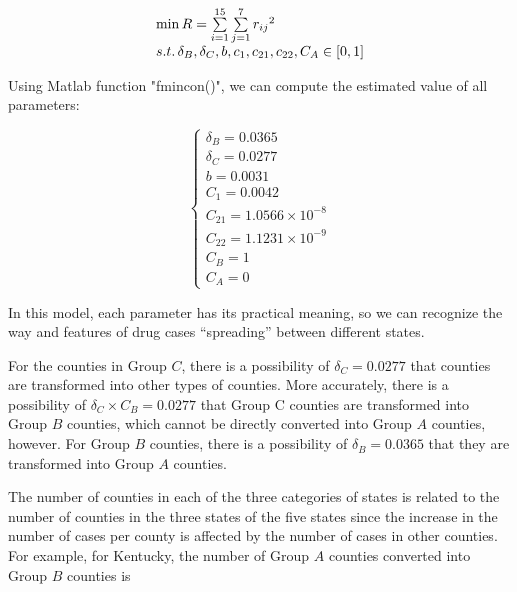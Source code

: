 \documentclass{mcmthesis}
\newcommand{\upcite}[1]{\textsuperscript{\textsuperscript{\cite{#1}}}}
\begin{document}
 \begin{equation}\begin{array}{l}
\min R = \sum\limits_{i = 1}^{15} {\sum\limits_{j = 1}^7 {{r_{ij}}^2} } \\
s.t.\,{\rm{  }}{\delta _B},{\delta _C},b,{c_1},{c_{21}},{c_{22}},{C_A} \in [0,1]
\end{array} \end{equation}
Using Matlab function "fmincon()"\upcite{higham2016matlab}, we can compute the estimated value of all parameters:
 
 \begin{equation}\left\{ \begin{array}{l}
{\delta _B} = 0.0365\\
{\delta _C} = 0.0277\\
b = 0.0031\\
{C_1} = 0.0042\\
{C_{21}} = 1.0566 \times {10^{ - 8}}\\
{C_{22}} = 1.1231 \times {10^{ - 9}}\\
{C_B} = 1\\
{C_A} = 0
\end{array} \right. \end{equation}

In this model, each parameter has its practical meaning, so we can recognize the way and features of drug cases “spreading” between different states.

For the counties in Group $C$, there is a possibility of ${\delta _C} = 0.0277$ that counties are transformed into other types of counties. More accurately, there is a possibility of ${\delta _C} \times {C_B} = 0.0277$ that Group C counties are transformed into Group $B$ counties, which cannot be directly converted into Group $A$ counties, however. For Group $B$ counties, there is a possibility of ${\delta _B} = 0.0365$ that they are transformed into Group $A$ counties.

The number of counties in each of the three categories of states is related to the number of counties in the three states of the five states since the increase in the number of cases per county is affected by the number of cases in other counties.  For example, for Kentucky, the number of Group $A$ counties converted into Group $B$ counties is
 
\end{document}
